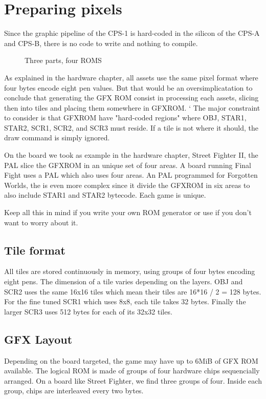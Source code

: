 \chapter{Preparing pixels}
Since the graphic pipeline of the CPS-1 is hard-coded in the silicon of the CPS-A and CPS-B, there is no code to write and nothing to compile. 

\begin{figure}[H]
\caption*{Three parts, four ROMS}
\end{figure}

As explained in the hardware chapter, all assets use the same pixel format where four bytes encode eight pen values. But that would be an oversimplicatation to conclude that generating the GFX ROM consist in processing each assets, slicing then into tiles and placing them somewhere in GFXROM.
`
The major constraint to consider is that GFXROM have "hard-coded regions" where OBJ, STAR1, STAR2, SCR1, SCR2, and SCR3 must reside. If a tile is not where it should, the draw command is simply ignored.

On the board we took as example in the hardware chapter, Street Fighter II, the  PAL slice the GFXROM in an unique set of four areas. A board running Final Fight uses a  PAL which also uses four areas. An PAL programmed for Forgotten Worlds, the  is even more complex since it divide the GFXROM in six areas to also include STAR1 and STAR2 bytecode. Each game is unique. 

Keep all this in mind if you write your own ROM generator or use  if you don't want to worry about it.

\section{Tile format}
All tiles are stored continuously in memory, using groups of four bytes encoding eight pens. The dimension of a tile varies depending on the layers. OBJ and SCR2 uses the same 16x16 tiles which mean their tiles are 16*16 / 2 = 128 bytes. For the fine tuned SCR1 which uses 8x8, each tile takes 32 bytes. Finally the larger SCR3 uses 512 bytes for each of its 32x32 tiles.

\section{GFX Layout}
Depending on the board targeted, the game may have up to 6MiB of GFX ROM available. The logical ROM is made of groups of four hardware chips sequencially arranged. On a board like Street Fighter, we find three groups of four. Inside each group, chips are interleaved every two bytes.

